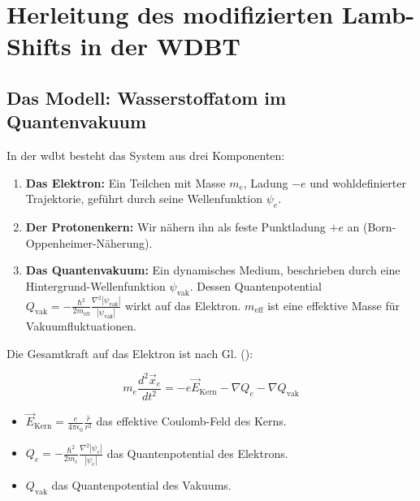 \chapter{Herleitung des modifizierten Lamb-Shifts in der WDBT}
\label{att:lamb_shift}

\section{Das Modell: Wasserstoffatom im Quantenvakuum}
In der \gls{wdbt} besteht das System aus drei Komponenten:

\begin{enumerate}
    \item \textbf{Das Elektron:} Ein Teilchen mit Masse $m_e$, Ladung $-e$ und wohldefinierter Trajektorie, geführt durch seine Wellenfunktion $\psi_e$.
    \item \textbf{Der Protonenkern:} Wir nähern ihn als feste Punktladung $+e$ an (Born-Oppenheimer-Näherung).
    \item \textbf{Das Quantenvakuum:} Ein dynamisches Medium, beschrieben durch eine Hintergrund-Wellenfunktion $\psi_\text{vak}$. Dessen Quantenpotential $Q_{\text{vak}} = -\frac{\hbar^2}{2m_{\text{eff}}} \frac{\nabla^2 \left|{\psi_{\text{vak}}}\right|}{\left|{\psi_{\text{vak}}}\right|}$ wirkt auf das Elektron. $m_\text{eff}$ ist eine effektive Masse für Vakuumfluktuationen.
\end{enumerate}

Die Gesamtkraft auf das Elektron ist nach Gl. ():

\begin{equation}
    m_e \frac{d^2\vec{x}_e}{dt^2} = -e\vec{E}_{\text{Kern}} - \nabla Q_e - \nabla Q_{\text{vak}}
\end{equation}

\begin{itemize}
    \item $\vec{E}_{\text{Kern}} = \frac{e}{4\pi\epsilon_0} \frac{\hat{r}}{r^2}$ das effektive Coulomb-Feld des Kerns.
    \item $Q_e = -\frac{\hbar^2}{2m_e} \frac{\nabla^2 |\psi_e|}{|\psi_e|}$ das Quantenpotential des Elektrons.
    \item $Q_\text{vak}$ das Quantenpotential des Vakuums.
\end{itemize}


